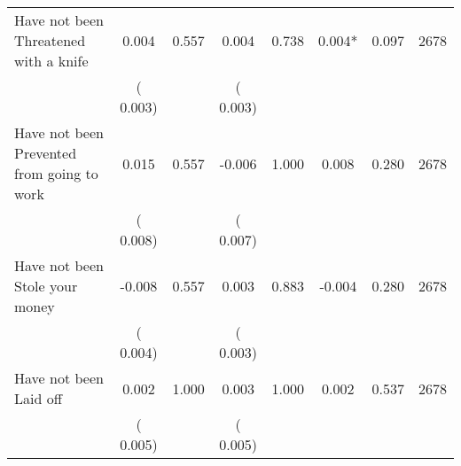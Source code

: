 \begin{tabular}{l*{7}{c}}
 Have not been Threatened with a knife       &              0.004       &        0.557  &              0.004       &        0.738  &              0.004*       &              0.097 &  2678 \\ 
                       &       (       0.003)             &                               &       (       0.003)                     &                               &                                               &                                &                      \\ 

 Have not been Prevented from going to work       &              0.015       &        0.557  &             -0.006       &        1.000  &              0.008       &              0.280 &  2678 \\ 
                       &       (       0.008)             &                               &       (       0.007)                     &                               &                                               &                                &                      \\ 

 Have not been Stole your money       &             -0.008       &        0.557  &              0.003       &        0.883  &             -0.004       &              0.280 &  2678 \\ 
                       &       (       0.004)             &                               &       (       0.003)                     &                               &                                               &                                &                      \\ 

 Have not been Laid off       &              0.002       &        1.000  &              0.003       &        1.000  &              0.002       &              0.537 &  2678 \\ 
                       &       (       0.005)             &                               &       (       0.005)                     &                               &                                               &                                &                      \\ 

\hline \end{tabular}